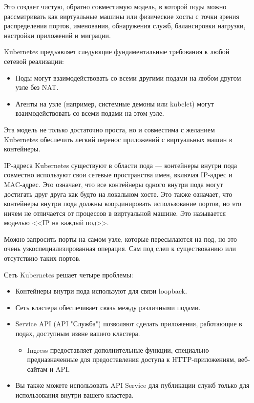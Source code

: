 \documentclass[a4page]{article}
\begin{document}
Это создает чистую, обратно совместимую модель, в которой поды можно рассматривать как виртуальные машины или физические хосты с точки зрения распределения портов, именования, обнаружения служб, балансировки нагрузки, настройки приложений и миграции.

Kubernetes предъявляет следующие фундаментальные требования к любой сетевой реализации:
\begin{itemize}
  \item Поды могут взаимодействовать со всеми другими подами на любом другом узле без NAT.
  \item Агенты на узле (например, системные демоны или kubelet) могут \\взаимодействовать со всеми подами на этом узле.
\end{itemize}

Эта модель не только достаточно проста, но и совместима с желанием Kubernetes обеспечить легкий перенос приложений с виртуальных машин в контейнеры.

IP-адреса Kubernetes существуют в области пода --- контейнеры внутри пода совместно используют свои сетевые пространства имен, включая IP-адрес и MAC-адрес. Это означает, что все контейнеры одного внутри пода могут достигать друг друга как будто на локальном хосте. Это также означает, что контейнеры внутри пода должны координировать использование портов, но это ничем не отличается от процессов в виртуальной машине. Это называется моделью <<IP на каждый под>>.

Можно запросить порты на самом узле, которые пересылаются на под, но это очень узкоспециализированная операция. Сам под слеп к существованию или отсутствию таких портов.

Сеть Kubernetes решает четыре проблемы:
\begin{itemize}
   \item Контейнеры внутри пода используют для связи loopback.
   \item Сеть кластера обеспечивает связь между различными подами.
   \item Service API (API "Служба") позволяют сделать приложения, работающие в подах, доступным извне вашего кластера.
     \begin{itemize}
       \item Ingress предоставляет дополнительные функции, специально предназначенные для предоставления доступа к HTTP-приложениям, веб-сайтам и API.
     \end{itemize}
   \item Вы также можете использовать API Service для публикации служб только для использования внутри вашего кластера.
\end{itemize}
\end{document}
